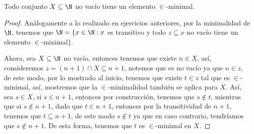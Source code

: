 \begin{exercise}[1.7]
  Todo conjunto $X \subseteq \N$ no vacío tiene un elemento $\in$-minimal.
\end{exercise}
\begin{proof}
  Análogamente a lo realizado en ejercicios anteriores, por la minimalidad de $\N$, tenemos que $\N = \{x \in \N : x$ es transitivo y todo $z \subseteq x$ no vacío tiene un elemento $\in$-minimal$\}$.

  Ahora, sea $X \subseteq \N$ no vacío, entonces tenemos que existe $n \in X$, así, consideremos $z = (n+1) \cap X \subseteq n+1$, notemos que es no vacío ya que $n \in z$, de este modo, por lo mostrado al inicio, tenemos que existe $t \in z$ tal que es $\in$-minimal, así, mostremos que la $\in$-minimalidad también se aplica para $X$. Así, sea $s \in X$, si $s \in n+1$, entonces por construcción, tenemos que $s \notin t$, mientras que si $s \notin n+1$, dado que $t \in n+1$, entonces por la transitividad de $n+1$, tenemos que $t \subseteq n+1$, de este modo $s \notin t$ ya que en caso contrario, tendríamos que $s \notin n+1$. De esta forma, tenemos que $t$ es $\in$-minimal en $X$.
\end{proof}